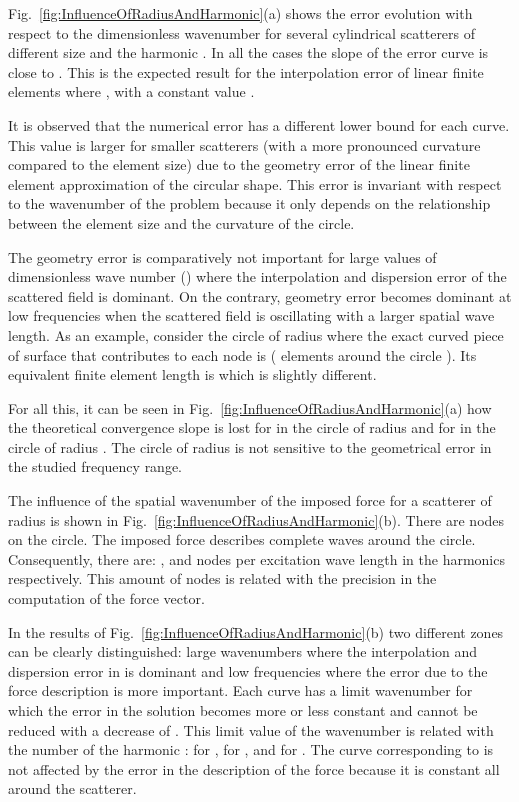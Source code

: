 \documentclass[12pt]{article}
\newcommand{\fref}[1]{Fig.~\ref{#1}}
\begin{document}
\fref{fig:InfluenceOfRadiusAndHarmonic}(a) shows the error evolution with respect to the  dimensionless wavenumber   for several cylindrical scatterers of different size and the harmonic . In all the cases the slope of the error curve is close to . This is the expected result for the interpolation error of linear finite elements where , with  a constant value \cite{Bouillard-Ihlenburg:99}.

It is observed that the numerical error has a different lower bound for each curve. This value is larger for smaller scatterers (with a more pronounced curvature compared to the element size) due to the geometry error of the linear finite element approximation of the circular shape. This error is invariant with respect to the wavenumber of the problem because it only depends on the relationship between the element size and the curvature of the circle. 

The geometry error is comparatively not important for large values of dimensionless wave number () where the interpolation and dispersion error of the scattered field is dominant. On the contrary, geometry error becomes dominant at low frequencies when the scattered field is oscillating with a larger spatial wave length. As an example, consider the circle of radius  where the exact curved piece of surface that contributes to each node is  ( elements around the circle ). Its equivalent finite element length is  which is slightly different.

For all this, it can be seen in  \fref{fig:InfluenceOfRadiusAndHarmonic}(a) how the theoretical convergence slope is lost for  in the circle of radius  and for  in the circle of radius . The circle of radius  is not sensitive to the geometrical error in the studied frequency range.

The influence of the spatial wavenumber of the imposed force for a scatterer of radius  is shown in \fref{fig:InfluenceOfRadiusAndHarmonic}(b). There are  nodes on the circle. The imposed force describes  complete waves around the circle. Consequently, there are: ,  and  nodes per excitation wave length in the harmonics   respectively. This amount of nodes is related with the precision in the computation of the force vector. 

In the results of \fref{fig:InfluenceOfRadiusAndHarmonic}(b) two different zones can be clearly distinguished: large wavenumbers where the interpolation and dispersion error in  is dominant and low frequencies where the error due to the force description is more important. Each curve has a limit wavenumber  for which the error in the solution becomes more or less constant and cannot be reduced with a decrease of .  This limit value of the wavenumber  is related with the number of the harmonic :  for ,  for ,  and  for . The curve corresponding to  is not affected by the error in the description of the force because it is constant all around the scatterer.
\end{document}
